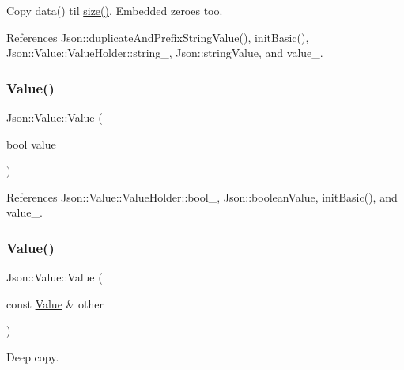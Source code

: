Copy data() til \hyperlink{classJson_1_1Value_a0ec2808e1d7efa4e9fad938d6667be44_a0ec2808e1d7efa4e9fad938d6667be44}{size()}. Embedded zeroes too. 



References Json\+::duplicate\+And\+Prefix\+String\+Value(), init\+Basic(), Json\+::\+Value\+::\+Value\+Holder\+::string\+\_\+, Json\+::string\+Value, and value\+\_\+.

\mbox{\label{classJson_1_1Value_a350a31ea4a30d384994b0bc010b17495_a350a31ea4a30d384994b0bc010b17495}} 
\subsubsection{\texorpdfstring{Value()}{Value()}\hspace{0.1cm}{\footnotesize\ttfamily [11/12]}}
{\footnotesize\ttfamily Json\+::\+Value\+::\+Value (\begin{DoxyParamCaption}\item[{bool}]{value }\end{DoxyParamCaption})}



References Json\+::\+Value\+::\+Value\+Holder\+::bool\+\_\+, Json\+::boolean\+Value, init\+Basic(), and value\+\_\+.

\mbox{\label{classJson_1_1Value_a436dfd3670f95fd665f680eba5cebcf0_a436dfd3670f95fd665f680eba5cebcf0}} 
\subsubsection{\texorpdfstring{Value()}{Value()}\hspace{0.1cm}{\footnotesize\ttfamily [12/12]}}
{\footnotesize\ttfamily Json\+::\+Value\+::\+Value (\begin{DoxyParamCaption}\item[{const \hyperlink{classJson_1_1Value}{Value} \&}]{other }\end{DoxyParamCaption})}



Deep copy. 



